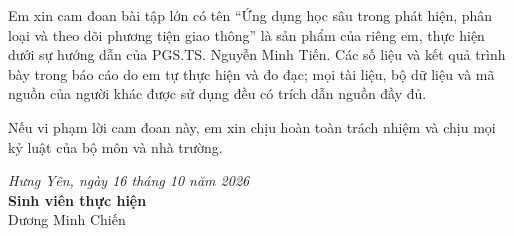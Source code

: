 
Em xin cam đoan bài tập lớn có tên ``Ứng dụng học sâu trong phát hiện, phân loại và theo dõi phương tiện giao
thông'' là sản phẩm của riêng em, thực hiện dưới sự hướng dẫn của PGS.TS. Nguyễn Minh Tiến. Các số liệu và kết quả
trình bày trong báo cáo do em tự thực hiện và đo đạc; mọi tài liệu, bộ dữ liệu và mã nguồn của người khác được sử
dụng đều có trích dẫn nguồn đầy đủ.

Nếu vi phạm lời cam đoan này, em xin chịu hoàn toàn trách nhiệm và chịu mọi kỷ luật của bộ môn và nhà trường.

\vspace{0.8cm}
\begin{flushright}
  \begin{minipage}{8cm}
    \centering
    \textit{Hưng Yên, ngày 16 tháng 10 năm 2026}\\[2pt]
    \textbf{Sinh viên thực hiện}\\[2.2cm]
    Dương Minh Chiến
  \end{minipage}
\end{flushright}
